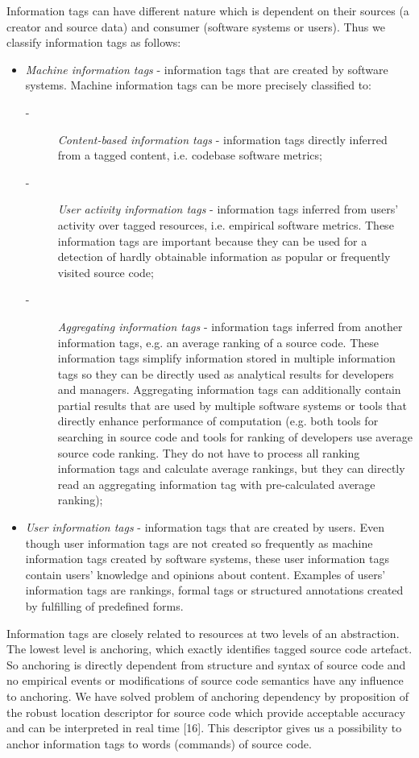 \documentclass[18px,a4, conference]{IEEEtran}
\begin{document}
  Information tags can have different nature which is dependent on their sources (a creator and source data) and consumer (software systems or users). Thus we classify information tags as follows: 
\begin{itemize}
\item \textit{Machine information tags} - information tags that are created by software systems. Machine information tags can be more precisely classiﬁed to: 
\begin{description}           																		%
\item [-] \textit{Content-based information tags} - information tags directly inferred from a tagged content, i.e. codebase software metrics;

\item [-] \textit{User activity information tags} - information tags inferred from users’ activity over tagged resources, i.e. empirical software metrics. These information tags are important because they can be used for a detection of hardly obtainable information as popular or frequently visited source code;
\item [-] \textit{Aggregating information tags} - information tags inferred from another information tags, e.g. an average ranking of a source code. These information tags simplify information stored in multiple information tags so they can be directly used as analytical results for developers and managers. Aggregating information tags can additionally contain partial results that are used by multiple software systems or tools that directly enhance performance of computation (e.g. both tools for searching in source code and tools for ranking of developers use average source code ranking. They do not have to process all ranking information tags and calculate average rankings, but they can directly read an aggregating information tag with pre-calculated average ranking);
\end{description}
\item \textit{User information tags} - information tags that are created by users. Even though user information tags are not created so frequently as machine information tags created by software systems, these user information tags contain users’ knowledge and opinions about content. Examples of users’ information tags are rankings, formal tags or structured annotations created by fulﬁlling of predeﬁned forms.
\end{itemize}

Information tags are closely related to resources at two levels of an abstraction. The lowest level is anchoring, which exactly identiﬁes tagged source code artefact. So anchoring is directly dependent from structure and syntax of source code and no empirical events or modiﬁcations of source code semantics have any inﬂuence to anchoring. We have solved problem of anchoring dependency by proposition of the robust location descriptor for source code which provide acceptable accuracy and can be interpreted in real time [16]. This descriptor gives us a possibility to anchor information tags to words (commands) of source code.
\end{document}
